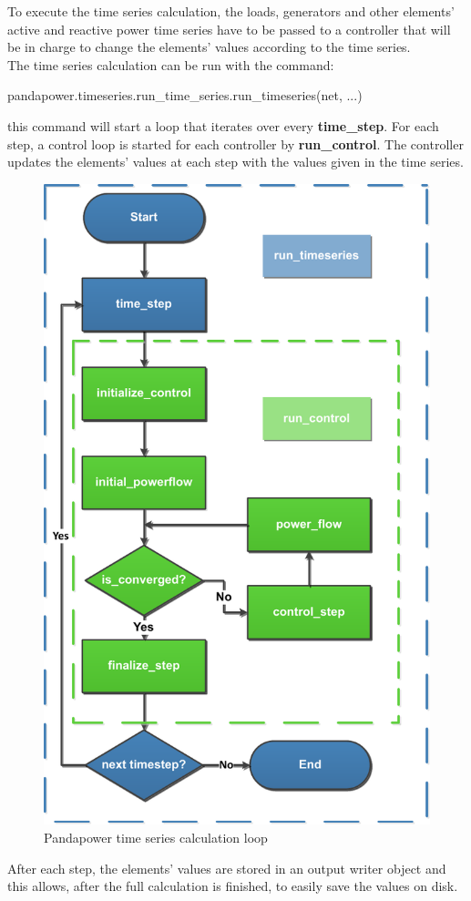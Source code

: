To execute the time series calculation, the loads, generators and other elements' active and reactive power time series have to be passed to a controller that will be in charge to change the elements' values according to the time series. \\

The time series calculation can be run with the command: 
\begin{algorithm}[h]
\state pandapower.timeseries.run\_time\_series.run\_timeseries(net, ...)
\end{algorithm}

\noindent this command will start a loop that iterates over every \textbf{time\_step}. For each step, a control loop is started for each controller by \textbf{run\_control}. The controller updates the elements' values at each step with the values given in the time series.

\begin{figure}[H]
\centering
    \includegraphics[width=.4\linewidth]{images/Background/Pandapower/run_timeseries_loop.pdf}
\caption[Pandapower time series calculation]{Pandapower time series calculation loop \cite{pandapowerts}}
\end{figure}

After each step, the elements' values are stored in an output writer object and this allows, after the full calculation is finished, to easily save the values on disk.

